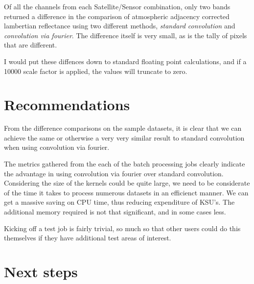 \documentclass[a4paper]{article}
\begin{document}
  \clearpage

    \begin{flushleft}
      Of all the channels from each Satellite/Sensor combination, only two bands returned a difference in the comparison of atmospheric adjacency corrected lambertian reflectance using two different methods, \textit{standard convolution} and \textit{convolution via fourier}. The difference itself is very small, as is the tally of pixels that are different. \par
      I would put these diffences down to standard floating point calculations, and if a 10000 scale factor is applied, the values will truncate to zero.
    \end{flushleft}

  \section{Recommendations}

    \begin{flushleft}
      From the difference comparisons on the sample datasets, it is clear that we can achieve the same or otherwise a very very similar result to standard convolution when using convolution via fourier. \par
      The metrics gathered from the each of the batch processing jobs clearly indicate the advantage in using convolution via fourier over standard convolution. Considering the size of the kernels could be quite large, we need to be considerate of the time it takes to process numerous datasets in an efficienct manner. We can get a massive saving on CPU time, thus reducing expenditure of KSU's. The additional memory required is not that significant, and in some cases less. \par
      Kicking off a test job is fairly trivial, so much so that other users could do this themselves if they have additional test areas of interest.
    \end{flushleft}

  \section{Next steps}
\end{document}
